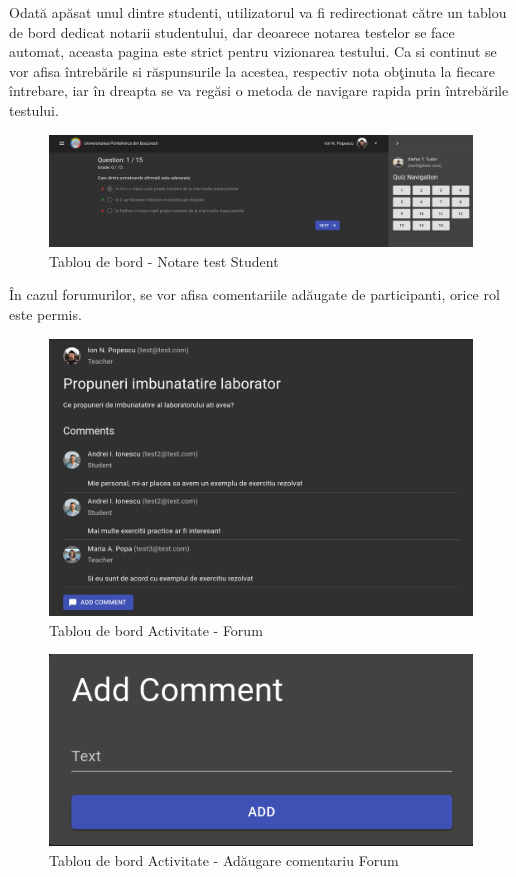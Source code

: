 \documentclass[12pt, a4paper, oneside, romanian]{teza-upb}
\begin{document}
Odată apăsat unul dintre studenti, utilizatorul va fi redirectionat către un tablou de bord dedicat notarii studentului, dar deoarece notarea testelor se face automat, aceasta pagina este strict pentru vizionarea testului. Ca si continut se vor afisa întrebările si răspunsurile la acestea, respectiv nota obţinuta la fiecare întrebare, iar în dreapta se va regăsi o metoda de navigare rapida prin întrebările testului.

\begin{figure}[H]
\centering
\includegraphics*[width=\columnwidth]{tablou-de-bord-notare-test-student}
\caption{Tablou de bord - Notare test Student}
\label{tablou-de-bord-notare-test-student}
\end{figure}

În cazul forumurilor, se vor afisa comentariile adăugate de participanti, orice rol este permis.

\begin{figure}[H]
\centering
\includegraphics*[width=\columnwidth]{tablou-de-bord-forum}
\caption{Tablou de bord Activitate - Forum}
\label{tablou-de-bord-forum}
\end{figure}

\begin{figure}[H]
\centering
\includegraphics*[width=0.5\columnwidth]{tablou-de-bord-activitate-adaugare-comentariu-forum}
\caption{Tablou de bord Activitate - Adăugare comentariu Forum}
\label{tablou-de-bord-activitate-adaugare-comentariu-forum}
\end{figure}
\end{document}
